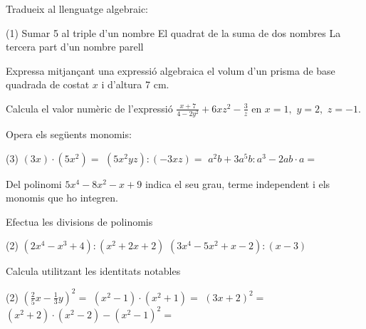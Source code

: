  
\newpage
\begin{autoaval}{49}

\begin{mylist}

\exer[2]  Tradueix al llenguatge algebraic:  

\begin{tasks}(1)
	\task  Sumar 5 al triple d'un nombre  
	\task  El quadrat de la suma de dos nombres   
	\task  La tercera part d'un nombre parell 
\end{tasks}
\answers{[$3x+5$, $(x+y)^2$, $\frac{2n}{3}$]}


\exer[2]  Expressa mitjançant una expressió algebraica el volum d'un prisma de base quadrada de costat $x$ i d'altura 7 cm.

\exer[2] Calcula el valor numèric de l'expressió $\frac{x+7}{4-2y^{2} } +6xz^{2} -\frac{3}{z} $ en $x=1,\, \, y=2,\, \, z=-1$.  

\exer[2]  Opera els següents monomis:
\begin{tasks}(3)
   \task $(3x)\cdot (5x^{2} )=$  
	\task  $(5x^{2} yz):(-3xz)=$  
	\task  $a^{2} b+3a^{5} b:a^{3} -2ab\cdot a=$
\end{tasks}
\answers{[$15x^3$, $-\frac{5}{3}xy$, $2a^2 b$]}

\exer[2]  Del polinomi $5x^{4} -8x^{2} -x+9$ indica el seu grau, terme independent i els monomis que ho integren. 

\exer[2]  Efectua les divisions de polinomis 

\begin{tasks}(2)
	\task  $(2x^{4} -x^{3} +4):(x^{2} +2x+2)$  
	\task $(3x^{4} -5x^{2} +x-2):(x-3)$
\end{tasks}
\answers[cols=1]{[$Q=2x^2-5x+6$; $R=-2x-8$, $Q=3x^3+9x^2+22x+67$; $R=199$]}


\exer[2]  Calcula utilitzant les identitats notables

\begin{tasks}(2)
	\task  $\left(\frac{2}{5} x-\frac{1}{3} y\right)^{2} =$  
	\task  $\left(x^{2} -1\right)\cdot \left(x^{2} +1\right)=$  
	\task  $\left(3x+2\right)^{2} =$ 
	\task   $\left(x^{2} +2\right)\cdot \left(x^{2} -2\right)-\left(x^{2} -1\right)^{2} =$
\end{tasks}


\end{mylist}
\end{autoaval}

